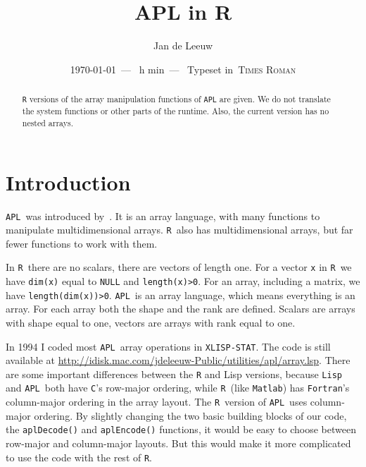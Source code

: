 \documentclass[11pt]{amsart}
\def\myfont{\textsc{Computer Modern}}
\def\myfont{\textsc{Lucida Bright}}
\def\myfont{\textsc{Palatino}}
\def\myfont{\textsc{Times Roman}}
\theoremstyle{plain}
\theoremstyle{definition}
\theoremstyle{remark}
\newcounter{hours}
\newcounter{minutes}
\newcommand\printtime{\setcounter{hours}{\time/60}%
	\setcounter{minutes}{\time-\value{hours}*60}%
	\thehours h \theminutes min}
\newcommand{\tR}{\texttt{R}}
\newcommand{\tA}{\texttt{APL}}
\newcommand{\tT}[1]{\texttt{#1}}
\newcommand{\tRc}[1]{\lstinline{#1}}
\newcommand{\tAc}[1]{{\apl{#1}}}
\begin{document}
\title{APL in R}
\author{Jan de Leeuw}
\address{Department of Statistics\\ University of California\\ Los Angeles, CA 90095-1554}
\ifpdf
{}
\else
{}
\fi
\date{\today\ ---\ \printtime\ --- \ Typeset in\ \myfont}
\begin{abstract}
\texttt{R} versions of the array manipulation functions of \texttt{APL}
are given. We do not translate the system functions or other parts of the
runtime. Also, the current version has no nested arrays.
\end{abstract}
\maketitle
\tableofcontents
\newpage
\section{Introduction}
\tA\ was introduced by~\citet{iverson_62}. It is an array language, with many functions to manipulate multidimensional arrays. \tR\ also has multidimensional arrays, but far fewer functions to work with them.

In \tR\ there are no scalars, there are vectors of length one. For a vector \tT{x}
in \tR\ we have \tRc{dim(x)} equal to \tT{NULL} and \tRc{length(x)>0}. For an array, including a matrix, 
we have \tRc{length(dim(x))>0}. \tA\ is an array
language, which means everything is an array. For each array both the shape \tAc{\qrho A} and the rank
\tAc{\qrho\qrho A} are defined. Scalars are arrays with shape equal to one, vectors are arrays with
rank equal to one.

In 1994 I coded most \tA\ array operations in \tT{XLISP-STAT}. The code is still available at \href{http://idisk.mac.com/jdeleeuw-Public/utilities/apl/array.lsp}{http://idisk.mac.com/jdeleeuw-Public/utilities/apl/array.lsp}. There are some important differences
between the \texttt{R} and Lisp versions, because \texttt{Lisp} and \tA\ both have
\texttt{C}'s row-major ordering, while \tR\ (like \texttt{Matlab}) has \texttt{Fortran}'s
column-major ordering in the array layout. The \tR\ version of
\tA\ uses column-major ordering. 
By slightly changing the two basic building blocks of our code, the \tRc{aplDecode()} and
\tRc{aplEncode()} functions, it would be easy to choose between row-major
and column-major layouts. But this would make it more complicated to use the code
with the rest of \tR. 
\end{document}
